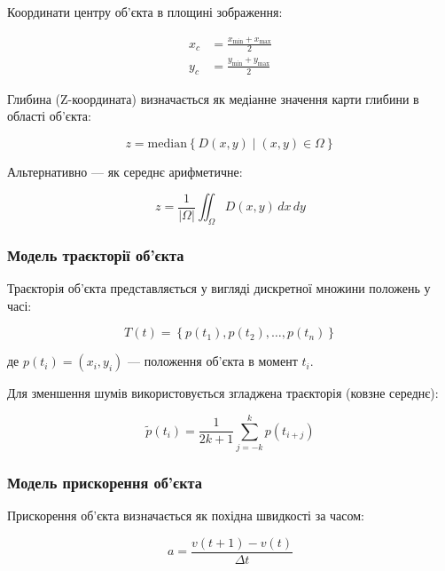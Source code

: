 \documentclass[14pt, a4paper]{extarticle}
\numberwithin{equation}{section}
\begin{document}
Координати центру об'єкта в площині зображення:

\begin{align}
x_c &= \frac{x_{\min} + x_{\max}}{2} \tag{3.22} \\
y_c &= \frac{y_{\min} + y_{\max}}{2} \tag{3.23}
\end{align}

Глибина (Z-координата) визначається як медіанне значення карти глибини в області об'єкта:

\begin{equation}
\boxed{z = \text{median}\left\{ D(x,y) \mid (x,y) \in \Omega \right\}} \tag{3.24}
\end{equation}

Альтернативно — як середнє арифметичне:

\begin{equation}
z = \frac{1}{|\Omega|} \iint_{\Omega} D(x,y) \, dx\,dy \tag{3.25}
\end{equation}

\subsubsection{Модель траєкторії об'єкта}

Траєкторія об'єкта представляється у вигляді дискретної множини положень у часі:

\begin{equation}
\boxed{T(t) = \left\{ p(t_1), p(t_2), \ldots, p(t_n) \right\}} \tag{3.26}
\end{equation}

де $p(t_i) = (x_i, y_i)$ — положення об'єкта в момент $t_i$.

Для зменшення шумів використовується згладжена траєкторія (ковзне середнє):

\begin{equation}
\tilde{p}(t_i) = \frac{1}{2k+1} \sum_{j=-k}^{k} p(t_{i+j}) \tag{3.27}
\end{equation}

\subsubsection{Модель прискорення об'єкта}

Прискорення об'єкта визначається як похідна швидкості за часом:

\begin{equation}
\boxed{a = \frac{v(t+1) - v(t)}{\Delta t}} \tag{3.28}
\end{equation}
\end{document}
